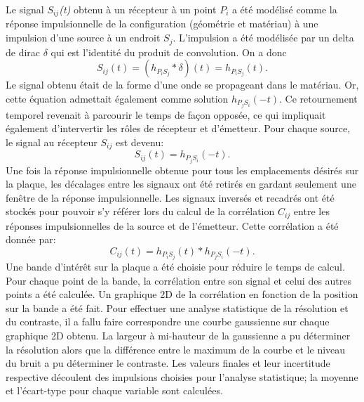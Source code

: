 \documentclass[conference]{IEEEtran}
\begin{document}
Le signal \textit{$S_{ij}$(t)} obtenu à un récepteur à un point \textit{$P_i$} a été
modélisé comme la réponse impulsionnelle de la configuration (géométrie et matériau) 
à une impulsion d'une source à un endroit \textit{$S_j$}. 
L'impulsion a été modélisée par un delta de dirac \textit{$\delta$} qui est 
l'identité du produit de convolution. On a donc
%
\[S_{ij}(t)=(h_{P_iS_j} * \delta)(t)=h_{P_iS_j}(t).\]
%
Le signal obtenu était de la forme d'une onde se propageant dans le matériau. Or, 
cette équation admettait également comme solution $h_{P_jS_i}(-t)$. Ce retournement
temporel revenait à parcourir le temps de façon opposée, ce qui impliquait également 
d'intervertir les rôles de récepteur et d'émetteur. 
%
Pour chaque source, le signal au récepteur \textit{$S_{ij}$} est devenu:
\[S_{ij}(t)=h_{P_jS_i}(-t).\]
Une fois la réponse impulsionnelle obtenue pour tous les emplacements désirés 
sur la plaque, les décalages entre les signaux ont été retirés en gardant seulement 
une fenêtre de la réponse impulsionnelle.
Les signaux inversés et recadrés ont été stockés pour pouvoir s'y 
référer lors du calcul de la corrélation \textit{$C_{ij}$} entre les réponses impulsionnelles de la 
source et de l'émetteur. 
Cette corrélation a été donnée par:
\[C_{ij}(t)=h_{P_iS_j}(t)*h_{P_jS_i}(-t).\]
%
Une bande d'intérêt sur la plaque a été choisie pour réduire le temps de calcul. 
Pour chaque point de la bande, la corrélation entre son signal et celui 
des autres points a été calculée. 
Un graphique 2D de la corrélation en fonction de la position sur la bande a été fait. 
Pour effectuer une analyse statistique de la résolution et du contraste, il a fallu 
faire correspondre une courbe gaussienne sur chaque graphique 2D obtenu. 
La largeur à mi-hauteur de la gaussienne a pu déterminer la résolution alors que la 
différence entre le maximum de la courbe et le niveau du bruit a pu déterminer le contraste.
Les valeurs finales et leur incertitude respective découlent des impulsions choisies 
pour l'analyse statistique; la moyenne et l'écart-type pour chaque variable sont calculées.
\end{document}
